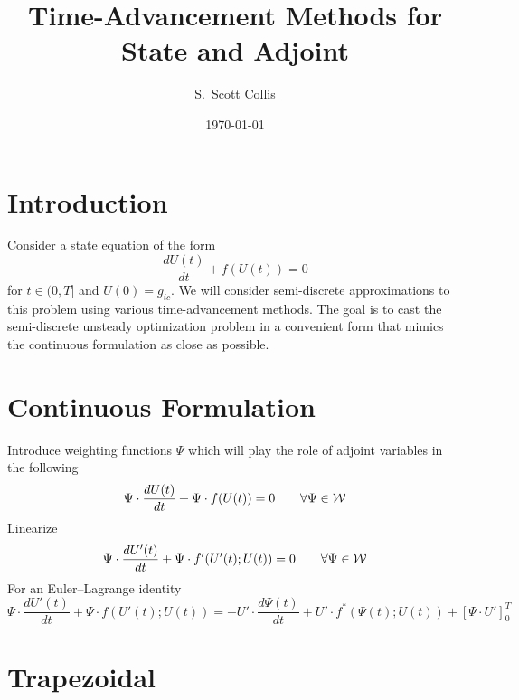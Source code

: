 \documentclass[10pt]{article}
\title{Time-Advancement Methods for State and Adjoint}
\author{S.\ Scott Collis}
\date{\today}
\begin{document}
\maketitle

%
\section*{Introduction}

Consider a state equation of the form
\begin{equation}
\frac{dU(t)}{dt} + f(U(t)) = 0
\end{equation}
for $t\in(0,T]$ and $U(0)=g_{ic}$.  We will consider semi-discrete
approximations to this problem using various time-advancement methods.  The
goal is to cast the semi-discrete unsteady optimization problem in a
convenient form that mimics the continuous formulation as close as possible.

%
\section*{Continuous Formulation}

Introduce weighting functions $\Psi$ which will play the role of adjoint
variables in the following
\begin{equation}
\Psi \cdot \frac{dU(t)}{dt} + \Psi \cdot f(U(t)) = 0 \qquad 
\forall \Psi\in{\cal W}
\end{equation}
Linearize
\begin{equation}
\Psi \cdot \frac{dU'(t)}{dt} + \Psi \cdot f'( U'(t) ; U(t) ) = 0 
\qquad \forall \Psi\in{\cal W}
\end{equation}
For an Euler--Lagrange identity
\begin{equation}
\Psi \cdot \frac{dU'(t)}{dt} + \Psi \cdot f(U'(t);U(t)) = 
-U' \cdot \frac{d\Psi(t)}{dt} + U' \cdot f^*(\Psi(t);U(t)) +
\left[ \Psi \cdot U' \right]_0^T
\end{equation}

%
\section*{Trapezoidal}
\end{document}
